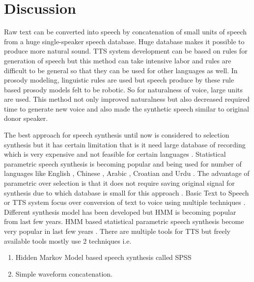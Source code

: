 \section{Discussion}
Raw text can be converted into speech by concatenation of small units of speech from a huge single-speaker speech database. Huge database makes it possible to produce more natural sound. TTS system development can be based on rules for generation of speech but this method can take intensive labor and rules are difficult to be general so that they can be used for other languages as well. In prosody modeling, linguistic rules are used \cite{klatt1987review, pierrehumbert1981synthesizing} but speech produce by these rule based prosody models felt to be robotic. So for naturalness of voice, large units are used. This method not only improved naturalness but also decreased required time to generate new voice and also made the synthetic speech similar to original donor speaker.

The best approach for speech synthesis until now is considered to selection synthesis but it has certain limitation that is it need large database of recording which is very expensive and not feasible for certain languages \cite{black1994chatr, hunt1996unit, black2003unit}. Statistical parametric speech synthesis is becoming popular and being used for number of languages like English \cite{tokuda2002hmm}, Chinese \cite{qian2006hmm}, Arabic \cite{abdel2006improving}, Croatian \cite{martincic2006croatian} and Urdu \cite{ahmed2014hmm}. The advantage of parametric over selection is that it does not require saving original signal for synthesis due to which database is small for this approach \cite{zen2009statistical}. Basic Text to Speech or TTS system focus over conversion of text to voice using multiple techniques \cite{merritt2013investigating}. Different synthesis model has been developed but HMM is becoming popular from last few years. HMM based statistical parametric speech synthesis become very popular in last few years \cite{ze2013statistical}. There are multiple tools for TTS but freely available tools mostly use 2 techniques i.e.

\begin{enumerate}
	\item Hidden Markov Model based speech synthesis called SPSS
	\item Simple waveform concatenation.
\end{enumerate}

